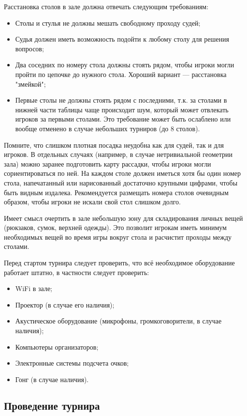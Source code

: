 Расстановка столов в зале должна отвечать следующим требованиям:
\begin{itemize}
	\item Столы и стулья не должны мешать свободному проходу судей;
	\item Судья должен иметь возможность подойти к любому столу для решения вопросов;
	\item Два соседних по номеру стола должны стоять рядом, чтобы игроки могли пройти по цепочке до нужного стола. Хороший вариант --- расстановка "змейкой";
	\item Первые столы не должны стоять рядом с последними, т.к. за столами в нижней части таблицы чаще происходит шум, который может отвлекать игроков за первыми столами. Это требование может быть ослаблено или вообще отменено в случае небольших турниров (до 8 столов).
\end{itemize}
Помните, что слишком плотная посадка неудобна как для судей, так и для игроков. В отдельных случаях (например, в случае нетривиальной геометрии зала) можно заранее подготовить карту рассадки, чтобы игроки могли сориентироваться по ней. На каждом столе должен иметься хотя бы один номер стола, напечатанный или нарисованный достаточно крупными цифрами, чтобы быть видным издалека. Рекомендуется размещать номера столов очевидным образом, чтобы игроки не искали свой стол слишком долго.

Имеет смысл очертить в зале небольшую зону для складирования личных вещей (рюкзаков, сумок, верхней одежды). Это позволит игрокам иметь минимум необходимых вещей во время игры вокруг стола и расчистит проходы между столами.

Перед стартом турнира следует проверить, что всё необходимое оборудование работает штатно, в частности следует проверить:
\begin{itemize}
	\item WiFi в зале;
	\item Проектор (в случае его наличия);
	\item Акустическое оборудование (микрофоны, громкоговорители, в случае наличия);
	\item Компьютеры организаторов;
	\item Электронные системы подсчета очков;
	\item Гонг (в случае наличия).
\end{itemize}

\subsection{Проведение турнира}

